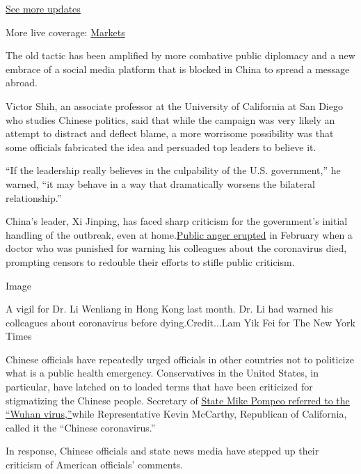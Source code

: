 \href{https://www.nytimes3xbfgragh.onion/2020/08/04/world/coronavirus-covid-19.html?action=click\&pgtype=Article\&state=default\&region=MAIN_CONTENT_1\&context=storylines_live_updates}{See
more updates}

More live coverage:
\href{https://www.nytimes3xbfgragh.onion/live/2020/08/03/business/stock-market-today-coronavirus?action=click\&pgtype=Article\&state=default\&region=MAIN_CONTENT_1\&context=storylines_live_updates}{Markets}

The old tactic has been amplified by more combative public diplomacy and
a new embrace of a social media platform that is blocked in China to
spread a message abroad.

Victor Shih, an associate professor at the University of California at
San Diego who studies Chinese politics, said that while the campaign was
very likely an attempt to distract and deflect blame, a more worrisome
possibility was that some officials fabricated the idea and persuaded
top leaders to believe it.

``If the leadership really believes in the culpability of the U.S.
government,'' he warned, ``it may behave in a way that dramatically
worsens the bilateral relationship.''

China's leader, Xi Jinping, has faced sharp criticism for the
government's initial handling of the outbreak, even at
home.\href{https://www.nytimes3xbfgragh.onion/2020/02/07/world/asia/china-coronavirus-doctor-death.html}{Public
anger erupted} in February when a doctor who was punished for warning
his colleagues about the coronavirus died, prompting censors to redouble
their efforts to stifle public criticism.

Image

A vigil for Dr. Li Wenliang in Hong Kong last month. Dr. Li had warned
his colleagues about coronavirus before dying.Credit...Lam Yik Fei for
The New York Times

Chinese officials have repeatedly urged officials in other countries not
to politicize what is a public health emergency. Conservatives in the
United States, in particular, have latched on to loaded terms that have
been criticized for stigmatizing the Chinese people. Secretary of
\href{https://www.nytimes3xbfgragh.onion/2020/03/10/us/politics/wuhan-virus.html?searchResultPosition=1}{State
Mike Pompeo referred to the ``Wuhan virus,''}while Representative Kevin
McCarthy, Republican of California, called it the ``Chinese
coronavirus.''

In response, Chinese officials and state news media have stepped up
their criticism of American officials' comments.


